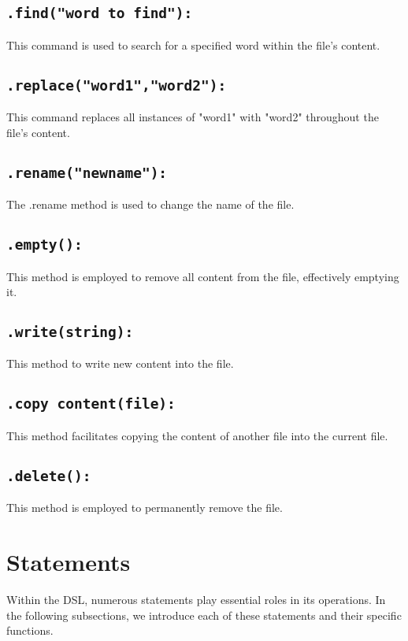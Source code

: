 \documentclass{article}
\begin{document}
\subsection{\texttt{.find("word to find"):}}

This command is used to search for a specified word within the file's content.
\subsection{\texttt{.replace("word1","word2"):}}

This command replaces all instances of "word1" with "word2" throughout the file's content.
\subsection{\texttt{.rename("newname"):}}

The .rename method is used to change the name of the file.
\subsection{\texttt{.empty():}}

This method is employed to remove all content from the file, effectively emptying it.
\subsection{\texttt{.write(string):}}

This method to write new content into the file.
\subsection{\texttt{.copy content(file):}}

This method facilitates copying the content of another file into the current file.
\subsection{\texttt{.delete():}}

This method is employed to permanently remove the file.

\section{Statements}
Within the DSL, numerous statements play essential roles in its operations. In the following subsections, we introduce each of these statements and their specific functions.
\end{document}
